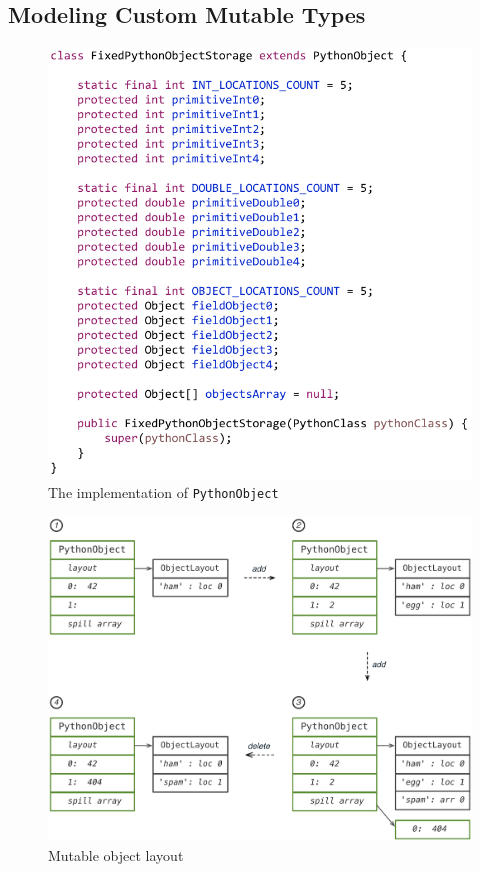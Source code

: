\subsection{Modeling Custom Mutable Types}
\label{sec:bg-custom-mutable-types}

\begin{figure}
\centering
\includegraphics[scale=.7]{figures/fixed-python-object-code}
\caption{The implementation of \texttt{PythonObject}}
\label{fig:bg-fixed-python-object-code}
\end{figure}

\begin{figure}
\centering
\includegraphics[scale=.34]{figures/mutable-object-layout-change}
\caption{Mutable object layout}
\label{fig:bg-mutable-object-layout-change}
\end{figure}

